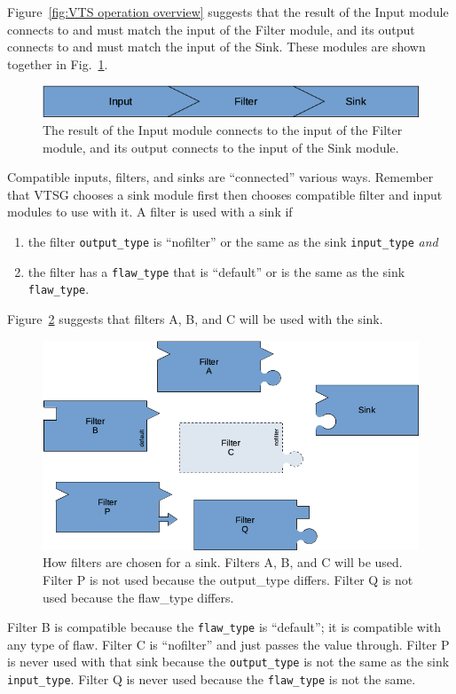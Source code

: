 \documentclass[12pt]{article}
\begin{document}
\label{sec:connecting inputs, filters, and sinks}
Figure~\ref{fig:VTS operation overview} suggests that the result of the Input module
connects to and must match the input of the Filter module, and its output connects to
and must match the input of the Sink.  These modules are shown together in
Fig.~\ref{fig:input, filter, and sink}.
\begin{figure}[htbp]
  \centerline{\includegraphics[width=.7\linewidth]{fig_input_filter_sink.png}}
  \caption{The result of the Input module connects to the input of the Filter module,
    and its output connects to the input of the Sink module.
  }
  \label{fig:input, filter, and sink}
\end{figure}
Compatible inputs, filters, and sinks are ``connected'' various ways.  Remember that
VTSG chooses a sink module first then chooses compatible filter and input modules to
use with it.  A filter is used with a sink if
\begin{enumerate}[nosep]
\item the filter \verb|output_type| is ``nofilter'' or the same as the sink
  \verb|input_type| \emph{and}
\item the filter has a \verb|flaw_type| that is ``default'' or is the same as the
  sink \verb|flaw_type|.
\end{enumerate}
Figure~\ref{fig:how filters fit a sink} suggests that filters A, B, and C will
be used with the sink.
\begin{figure}[htbp]
  \centerline{\includegraphics[width=.8\linewidth]{fig_filters_and_sinks.png}}
  \caption{How filters are chosen for a sink.  Filters A, B, and C will be used.
    Filter P is not used because the output\_type differs.  Filter Q is not
    used because the flaw\_type differs.
  }
  \label{fig:how filters fit a sink}
\end{figure}
Filter B is compatible because the \verb|flaw_type| is
``default''; it is compatible with any type of flaw.  Filter C is ``nofilter'' and
just passes the value through.  Filter P is never used with that sink because
the \verb|output_type| is not the same as the sink \verb|input_type|.
Filter Q is never used because the \verb|flaw_type| is not the same.
\end{document}
